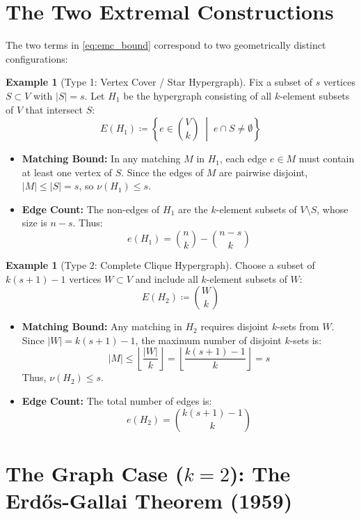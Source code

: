 \documentclass[11pt,a4paper]{article}
\theoremstyle{definition}
\newtheorem{example}[theorem]{Example}
\begin{document}
\section{The Two Extremal Constructions}

The two terms in \eqref{eq:emc_bound} correspond to two geometrically distinct configurations:

\begin{example}[Type 1: Vertex Cover / Star Hypergraph]\label{ex:type1}
Fix a subset of $s$ vertices $S \subset V$ with $|S| = s$.
Let $H_1$ be the hypergraph consisting of all $k$-element subsets of $V$ that intersect $S$:
\[ E(H_1) \coloneqq \left\{ e \in \binom{V}{k} \;\middle|\; e \cap S \ne \emptyset \right\} \]
\begin{itemize}
    \item \textbf{Matching Bound:} In any matching $M$ in $H_1$, each edge $e \in M$ must contain at least one vertex of $S$. Since the edges of $M$ are pairwise disjoint, $|M| \le |S| = s$, so $\nu(H_1) \le s$.
    \item \textbf{Edge Count:} The non-edges of $H_1$ are the $k$-element subsets of $V \setminus S$, whose size is $n - s$.
    Thus:
    \[ e(H_1) = \binom{n}{k} - \binom{n - s}{k} \]
\end{itemize}
\end{example}

\begin{example}[Type 2: Complete Clique Hypergraph]\label{ex:type2}
Choose a subset of $k(s + 1) - 1$ vertices $W \subset V$ and include all $k$-element subsets of $W$:
\[ E(H_2) \coloneqq \binom{W}{k} \]
\begin{itemize}
    \item \textbf{Matching Bound:} Any matching in $H_2$ requires disjoint $k$-sets from $W$.
    Since $|W| = k(s + 1) - 1$, the maximum number of disjoint $k$-sets is:
    \[ |M| \le \left\lfloor \frac{|W|}{k} \right\rfloor = \left\lfloor \frac{k(s + 1) - 1}{k} \right\rfloor = s \]
    Thus, $\nu(H_2) \le s$.
    \item \textbf{Edge Count:} The total number of edges is:
    \[ e(H_2) = \binom{k(s + 1) - 1}{k} \]
\end{itemize}
\end{example}

\section{The Graph Case ($k = 2$): The Erd\H{o}s-Gallai Theorem (1959)}
\end{document}
